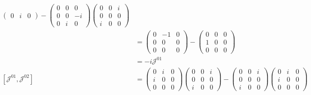 \documentclass{article}
\numberwithin{equation}{section}
\theoremstyle{solution}
\begin{document}
\begin{align*}
\begin{pmatrix}
                0 & i & 0
        \end{pmatrix}
        -
        \begin{pmatrix}
                0 & 0 & 0 \\
                0 & 0 & -i \\
                0 & i & 0
        \end{pmatrix}
        \begin{pmatrix}
                0 & 0 & i \\
                0 & 0 & 0 \\
                i & 0 & 0
        \end{pmatrix}
        \\
        &= 
        \begin{pmatrix}
                0 & -1 & 0 \\
                0 & 0 & 0 \\
                0 & 0 & 0
        \end{pmatrix}
        -
        \begin{pmatrix}
                0 & 0 & 0 \\
                1 & 0 & 0 \\
                0 & 0 & 0
        \end{pmatrix}
        \\
        &= 
        -i \mathcal{J}^{01}\\
        [\mathcal{J}^{01}, \mathcal{J}^{02}] &= 
        \begin{pmatrix}
                0 & i & 0 \\
                i & 0 & 0 \\
                0 & 0 & 0
        \end{pmatrix}
        \begin{pmatrix}
                0 & 0 & i \\
                0 & 0 & 0 \\
                i & 0 & 0
        \end{pmatrix}
        -
        \begin{pmatrix}
                0 & 0 & i \\
                0 & 0 & 0 \\
                i & 0 & 0
        \end{pmatrix}
        \begin{pmatrix}
                0 & i & 0 \\
                i & 0 & 0 \\
                0 & 0 & 0

\end{pmatrix}
\end{align*}
\end{document}
